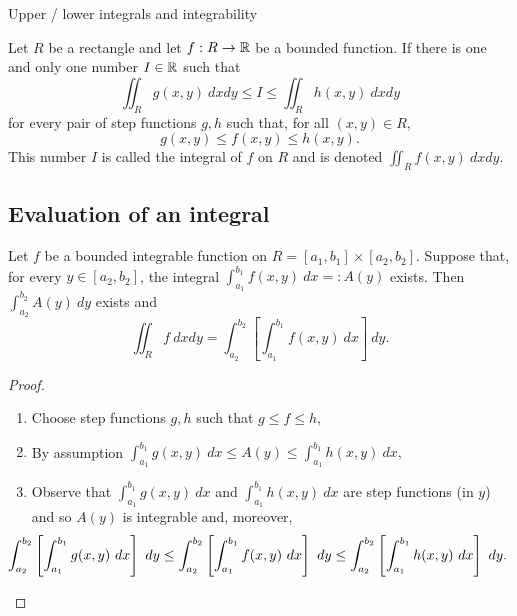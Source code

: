 {Upper / lower integrals and integrability}

\begin{definition}[integrability]
    Let \(R\) be a rectangle and let \(f: R \to \mathbb{R}\) be a bounded function.
    If there is one and only one number \(I\in \mathbb{R}\) such that
    \[
        \iint_{R} g(x,y) \ dxdy \leq I \leq \iint_{R} h(x,y) \ dxdy
    \]
    for every pair of step functions \( g, h\) such that, for all \((x,y)\in R\),
    \[
        g(x,y) \leq f(x,y) \leq h(x,y).
    \]
    This number \(I\) is called the integral of \(f\) on \(R\) and is denoted \(\iint_{R} f(x,y) \ dxdy\).
\end{definition}


\subsection{Evaluation of an integral}

\begin{theorem}
    Let \(f\) be a bounded integrable function on  \(R = [a_1,b_1] \times [a_2,b_2]\).
    Suppose that, for every \(y\in [a_2,b_2]\), the integral \(\int_{a_1}^{b_1} f(x,y) \ dx =: A(y)\) exists.
    Then \(\int_{a_2}^{b_2} A(y) \ dy\) exists and
    \[
        \iint_{R} f \ dxdy = \int_{a_2}^{b_2} \left[ \int_{a_1}^{b_1} f(x,y) \ dx  \right] \ dy.
    \]
\end{theorem}

\begin{proof}
    \begin{enumerate}
        \item Choose step functions \(g,h\) such that \(g\leq f \leq h\),
        \item By assumption \(\int_{a_1}^{b_1} g(x,y) \ dx \leq A(y) \leq \int_{a_1}^{b_1} h(x,y) \ dx,  \)
        \item Observe that \(\int_{a_1}^{b_1} g(x,y) \ dx \) and \(\int_{a_1}^{b_1} h(x,y) \ dx\) are step functions (in \(y\)) and so \(A(y)\) is integrable and, moreover,
              \[ \hspace{-2em}
                  \int_{a_2}^{b_2} \left[ \int_{a_1}^{b_1} g(x,y) \ dx  \right] \ dy
                  \leq \int_{a_2}^{b_2} \left[ \int_{a_1}^{b_1} f(x,y) \ dx  \right] \ dy
                  \leq \int_{a_2}^{b_2} \left[ \int_{a_1}^{b_1} h(x,y) \ dx  \right] \ dy.
              \]
    \end{enumerate}
\end{proof}

